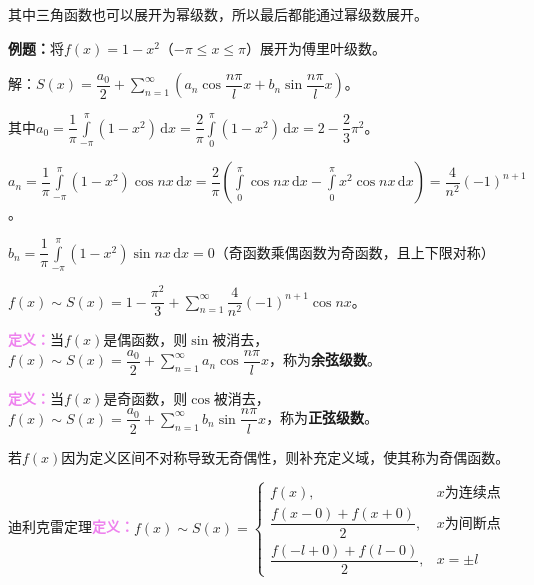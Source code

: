 \documentclass[UTF8, 12pt]{ctexart}
\begin{document}
其中三角函数也可以展开为幂级数，所以最后都能通过幂级数展开。

\textbf{例题：}将$f(x)=1-x^2$（$-\pi\leqslant x\leqslant\pi$）展开为傅里叶级数。

解：$S(x)=\dfrac{a_0}{2}+\sum\limits_{n=1}^\infty\left(a_n\cos\dfrac{n\pi}{l}x+b_n\sin\dfrac{n\pi}{l}x\right)$。

其中$a_0=\dfrac{1}{\pi}\int\limits_{-\pi}^\pi(1-x^2)\,\textrm{d}x=\dfrac{2}{\pi}\int\limits_0^\pi(1-x^2)\,\textrm{d}x=2-\dfrac{2}{3}\pi^2$。

$a_n=\dfrac{1}{\pi}\int\limits_{-\pi}^\pi(1-x^2)\cos nx\,\textrm{d}x=\dfrac{2}{\pi}(\int\limits_0^\pi\cos nx\,\textrm{d}x-\int\limits_0^\pi x^2\cos nx\,\textrm{d}x)=\dfrac{4}{n^2}(-1)^{n+1}$。

$b_n=\dfrac{1}{\pi}\int\limits_{-\pi}^\pi(1-x^2)\sin nx\,\textrm{d}x=0$（奇函数乘偶函数为奇函数，且上下限对称）

$f(x)\sim S(x)=1-\dfrac{\pi^2}{3}+\sum\limits_{n=1}^\infty\dfrac{4}{n^2}(-1)^{n+1}\cos nx$。

\textcolor{violet}{\textbf{定义：}}当$f(x)$是偶函数，则$\sin$被消去，$f(x)\sim S(x)=\dfrac{a_0}{2}+\sum\limits_{n=1}^\infty a_n\cos\dfrac{n\pi}{l}x$，称为\textbf{余弦级数}。

\textcolor{violet}{\textbf{定义：}}当$f(x)$是奇函数，则$\cos$被消去，$f(x)\sim S(x)=\dfrac{a_0}{2}+\sum\limits_{n=1}^\infty b_n\sin\dfrac{n\pi}{l}x$，称为\textbf{正弦级数}。

若$f(x)$因为定义区间不对称导致无奇偶性，则补充定义域，使其称为奇偶函数。

迪利克雷定理\textcolor{violet}{\textbf{定义：}}$f(x)\sim S(x)=\left\{\begin{array}{ll}
    f(x), & x\text{为连续点} \\
    \dfrac{f(x-0)+f(x+0)}{2}, & x\text{为间断点} \\
    \dfrac{f(-l+0)+f(l-0)}{2}, & x=\pm l
\end{array}\right.$
\end{document}
